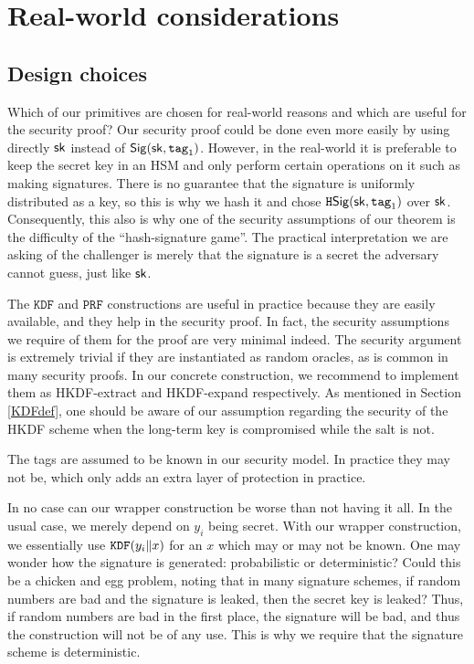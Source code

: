 \documentclass{article}
\begin{document}
\section{Real-world considerations} \label{sec:notes}

\subsection{Design choices}
Which of our primitives are chosen for real-world reasons and which are useful for the security proof? Our security proof could be done even more easily by using directly $\mathsf{sk}$ instead of $\mathsf{Sig}(\mathsf{sk}, \texttt{tag}_1)$. However, in the real-world it is preferable to keep the secret key in an HSM and only perform certain operations on it such as making signatures. There is no guarantee that the signature is uniformly distributed as a key, so this is why we hash it and chose $\texttt{H}\mathsf{Sig}(\mathsf{sk}, \texttt{tag}_1)$ over $\mathsf{sk}$. Consequently, this also is why one of the security assumptions of our theorem is the difficulty of the ``hash-signature game''. The practical interpretation we are asking of the challenger is merely that the signature is a secret the adversary cannot guess, just like $\mathsf{sk}$.

The $\texttt{KDF}$ and $\texttt{PRF}$ constructions are useful in practice because they are easily available, and they help in the security proof. In fact, the security assumptions we require of them for the proof are very minimal indeed. The security argument is extremely trivial if they are instantiated as random oracles, as is common in many security proofs. In our concrete construction, we recommend to implement them as HKDF-extract and HKDF-expand respectively. As mentioned in Section \ref{KDFdef}, one should be aware of our assumption regarding the security of the HKDF scheme when the long-term key is compromised while the salt is not.

The tags are assumed to be known in our security model. In practice they may not be, which only adds an extra layer of protection in practice.

In no case can our wrapper construction be worse than not having it all. In the usual case, we merely depend on $y_i$ being secret. With our wrapper construction, we essentially use $\texttt{KDF}(y_i \| x)$ for an $x$ which may or may not be known. One may wonder how the signature is generated: probabilistic or deterministic? Could this be a chicken and egg problem, noting that in many signature schemes, if random numbers are bad and the signature is leaked, then the secret key is leaked? Thus, if random numbers are bad in the first place, the signature will be bad, and thus the construction will not be of any use. This is why we require that the signature scheme is deterministic.
\end{document}
